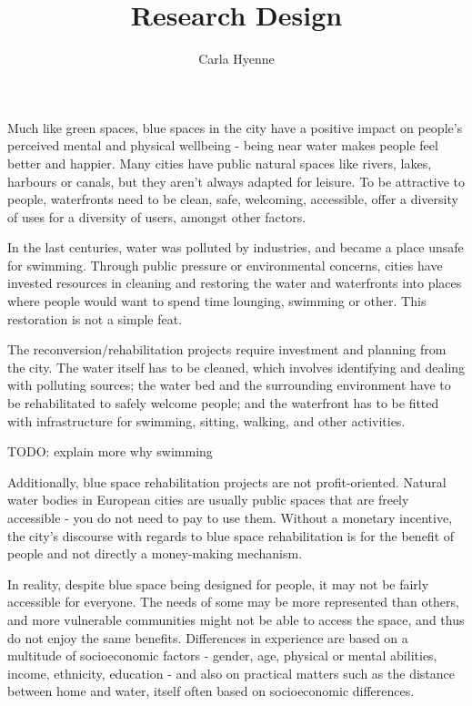 \documentclass{article}
\title{Research Design}
\author{Carla Hyenne}
\date{}
\begin{document}
\maketitle


Much like green spaces, blue spaces in the city have a positive impact on people's perceived mental and physical wellbeing - being near water makes people feel better and happier. Many cities have public natural spaces like rivers, lakes, harbours or canals, but they aren't always adapted for leisure. To be attractive to people, waterfronts need to be clean, safe, welcoming, accessible, offer a diversity of uses for a diversity of users, amongst other factors. 

In the last centuries, water was polluted by industries, and became a place unsafe for swimming. Through public pressure or environmental concerns, cities have invested resources in cleaning and restoring the water and waterfronts into places where people would want to spend time lounging, swimming or other. This restoration is not a simple feat. 

The reconversion/rehabilitation projects require investment and planning from the city. The water itself has to be cleaned, which involves identifying and dealing with polluting sources; the water bed and the surrounding environment have to be rehabilitated to safely welcome people; and the waterfront has to be fitted with infrastructure for swimming, sitting, walking, and other activities.

TODO: explain more why swimming

Additionally, blue space rehabilitation projects are not profit-oriented. Natural water bodies in European cities are usually public spaces that are freely accessible - you do not need to pay to use them. Without a monetary incentive, the city's discourse with regards to blue space rehabilitation is for the benefit of people and not directly a money-making mechanism.

In reality, despite blue space being designed for people, it may not be fairly accessible for everyone. The needs of some may be more represented than others, and more vulnerable communities might not be able to access the space, and thus do not enjoy the same benefits. Differences in experience are based on a multitude of socioeconomic factors - gender, age, physical or mental abilities, income, ethnicity, education - and also on practical matters such as the distance between home and water, itself often based on socioeconomic differences.
\end{document}
